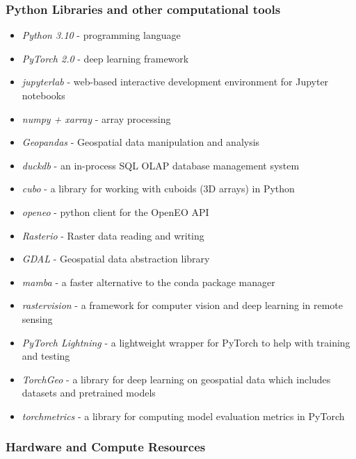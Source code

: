 \begin{multicols}{2}
\subsubsection{Python Libraries and other computational tools}
\begin{itemize}
    \item \textit{Python 3.10} - programming language  
    \item \textit{PyTorch 2.0} - deep learning framework  
    \item \textit{jupyterlab} - web-based interactive development environment for Jupyter notebooks
    \item \textit{numpy + xarray} - array processing
    \item \textit{Geopandas} - Geospatial data manipulation and analysis
    \item \textit{duckdb} - an in-process SQL OLAP database management system
    \item \textit{cubo} - a library for working with cuboids (3D arrays) in Python
    \item \textit{openeo} - python client for the OpenEO API
    \item \textit{Rasterio} - Raster data reading and writing
    \item \textit{GDAL} - Geospatial data abstraction library
    \item \textit{mamba} - a faster alternative to the conda package manager
    \item \textit{rastervision} - a framework for computer vision and deep learning in remote sensing
    \item \textit{PyTorch Lightning} - a lightweight wrapper for PyTorch to help with training and testing
    \item \textit{TorchGeo} - a library for deep learning on geospatial data which includes datasets and pretrained models
    \item \textit{torchmetrics} - a library for computing model evaluation metrics in PyTorch
\end{itemize}

\subsubsection{Hardware and Compute Resources}


\end{multicols}
